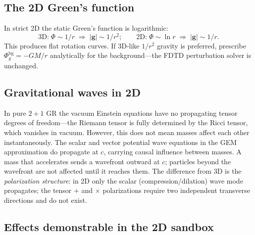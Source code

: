 \documentclass[11pt,a4paper]{article}
\newcommand{\vv}[1]{\mathbf{#1}}
\newcommand{\Phig}{\Phi_g}
\begin{document}
\subsection{The 2D Green's function}

In strict 2D the static Green's function is logarithmic:
\begin{equation}
  \text{3D:}\; \Phi\sim 1/r \;\Rightarrow\; |\vv{g}|\sim 1/r^2; \qquad
  \text{2D:}\; \Phi\sim \ln r \;\Rightarrow\; |\vv{g}|\sim 1/r.
\end{equation}
This produces flat rotation curves.  If 3D-like $1/r^2$ gravity is preferred, prescribe $\Phig^{\mathrm{bg}} = -GM/r$ analytically for the background---the FDTD perturbation solver is unchanged.

\subsection{Gravitational waves in 2D}

In pure $2+1$ GR the vacuum Einstein equations have no propagating tensor degrees of freedom---the Riemann tensor is fully determined by the Ricci tensor, which vanishes in vacuum.  However, this does not mean masses affect each other instantaneously.  The scalar and vector potential wave equations in the GEM approximation do propagate at $c$, carrying causal influence between masses.  A mass that accelerates sends a wavefront outward at $c$; particles beyond the wavefront are not affected until it reaches them.  The difference from 3D is the \emph{polarization structure}: in 2D only the scalar (compression/dilation) wave mode propagates; the tensor $+$ and $\times$ polarizations require two independent transverse directions and do not exist.

\subsection{Effects demonstrable in the 2D sandbox}
\end{document}

